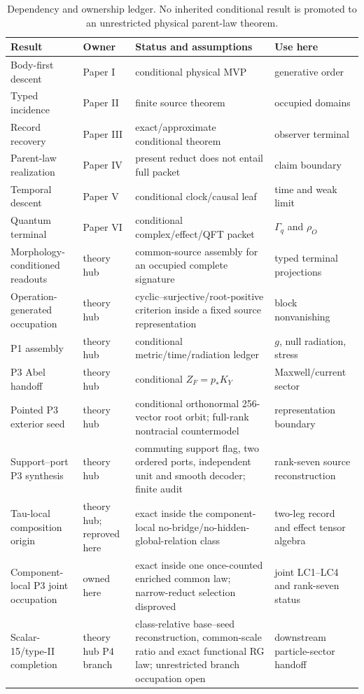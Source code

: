 \documentclass[11pt]{article}
\begin{document}
\begin{table}[ht]
\centering\small
\begin{tabularx}{\textwidth}{@{}p{}p{}Xp{}@{}}
\toprule
Result & Owner & Status and assumptions & Use here\\
\midrule
Body-first descent & Paper I & conditional physical MVP & generative order\\
Typed incidence & Paper II & finite source theorem & occupied domains\\
Record recovery & Paper III & exact/approximate conditional theorem & observer terminal\\
Parent-law realization & Paper IV & present reduct does not entail full packet & claim boundary\\
Temporal descent & Paper V & conditional clock/causal leaf & time and weak limit\\
Quantum terminal & Paper VI & conditional complex/effect/QFT packet & $\Gamma_q$ and $\rho_O$\\
Morphology-conditioned readouts & theory hub & common-source assembly for an
occupied complete signature & typed terminal projections\\
Operation-generated occupation & theory hub & cyclic--surjective/root-positive criterion
inside a fixed source representation & block nonvanishing\\
P1 assembly & theory hub & conditional metric/time/radiation ledger & $g$, null radiation, stress\\
P3 Abel handoff & theory hub & conditional $Z_F=p_*K_Y$ & Maxwell/current sector\\
Pointed P3 exterior seed & theory hub & conditional orthonormal 256-vector
root orbit; full-rank nontracial countermodel & representation boundary\\
Support--port P3 synthesis & theory hub & commuting support flag, two ordered
ports, independent unit and smooth decoder; finite audit & rank-seven
source reconstruction\\
Tau-local composition origin & theory hub; reproved here & exact inside the
component-local no-bridge/no-hidden-global-relation class & two-leg record
and effect tensor algebra\\
Component-local P3 joint occupation & owned here & exact inside one
once-counted enriched common law; narrow-reduct selection disproved & joint
LC1--LC4 and rank-seven status\\
Scalar-15/type-II completion & theory hub P4 branch & class-relative
base--seed reconstruction, common-scale ratio and exact functional RG law;
unrestricted branch occupation open & downstream particle-sector handoff\\
\bottomrule
\end{tabularx}
\caption{Dependency and ownership ledger. No inherited conditional result is
promoted to an unrestricted physical parent-law theorem.}
\label{tab:dependencyledger}
\end{table}
\end{document}
